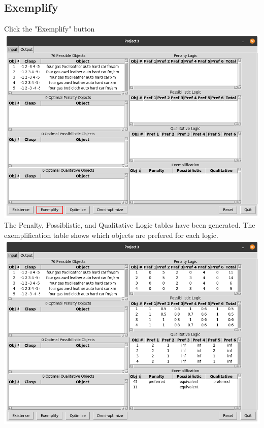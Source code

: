 \documentclass[titlepage]{article}
\begin{document}
\subsection{Exemplify} Click the "Exemplify" button\\
\includegraphics[scale=0.3]{exemplify}\\
The Penalty, Possiblistic, and Qualitative Logic tables have been generated. The exemplification table shows which objects are prefered for each logic.\\
\includegraphics[scale=0.3]{post_exemplify}
\newpage
\end{document}
